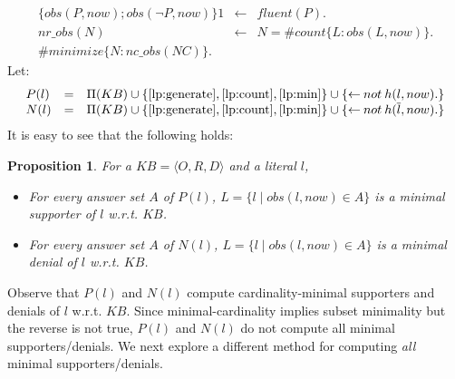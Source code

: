 \documentclass{article}
\newtheorem{proposition}[theorem]{Proposition}
\def\naf{\: {not} \:}
\begin{document}
\begin{eqnarray}
 \{obs(P, now); obs(\neg P, now)\} 1 &\leftarrow  &   fluent(P).     \label{lp:generate} \\  
 nr\_obs(N) &\leftarrow &  N = \#count \{L:obs(L,now)\}.  \label{lp:count} \\ 
{\#minimize  \{N : nc\_obs(NC)\}.} & & \label{lp:min} 
\end{eqnarray}
%
Let:
\[
\begin{array}{lcl}
P(l) & = & \Pi(KB) \cup  \{\eqref{lp:generate}, \eqref{lp:count}, \eqref{lp:min}\} \cup \{{\leftarrow} \naf h(l, now).\}\\
N(l) &= &  \Pi(KB) \cup  \{\eqref{lp:generate}, \eqref{lp:count}, \eqref{lp:min}\} \cup \{{\leftarrow} \naf h(\overline{l}, now).\}
\end{array}
\]  
%
%
%
%
%
It is easy to see that the following holds: 
\begin{proposition} 
For a $KB = \langle O, R,D \rangle$ and a literal $l$, 
\begin{itemize} 
\item For every answer set $A$ of $P(l)$,  $L = \{l \mid obs(l, now) \in A\}$ is a minimal supporter of $l$ w.r.t. $KB$. 
\item For every answer set $A$ of $N(l)$,  $L = \{l \mid obs(l, now) \in A\}$ is a minimal denial of $l$ w.r.t. $KB$. 
\end{itemize} 
\end{proposition} 
Observe that $P(l)$ and $N(l)$ compute cardinality-minimal supporters and denials of $l$ w.r.t. $KB$. 
Since minimal-cardinality  implies subset minimality but the reverse is not true,  
$P(l)$ and $N(l)$ do not compute all minimal supporters/denials. We next explore a different method for computing {\em all} 
minimal supporters/denials.
%
%
\end{document}
